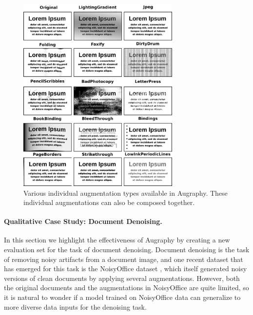 \documentclass[runningheads]{llncs}
\begin{document}
\begin{figure}
    \centering
    \includegraphics[width=0.72\textwidth]{augraphy_various.png}
    \caption{Various individual augmentation types available in Augraphy. These individual augmentations can also be composed together.}
    \label{fig:augmentations}
\end{figure}




\paragraph{\textbf{Qualitative Case Study: Document Denoising.~~}}
In this section we highlight the effectiveness of Augraphy by creating a new evaluation set for the task of document denoising.
Document denoising is the task of removing noisy artifacts from a document image, and one recent dataset that has emerged for this task is the NoisyOffice dataset \cite{noisyoffice}, which itself generated noisy versions of clean documents by applying several augmentations.
However, both the original documents and the augmentations in NoisyOffice are quite limited, so it is natural to wonder if a model trained on NoisyOffice data can generalize to more diverse data inputs for the denoising task.
\end{document}

